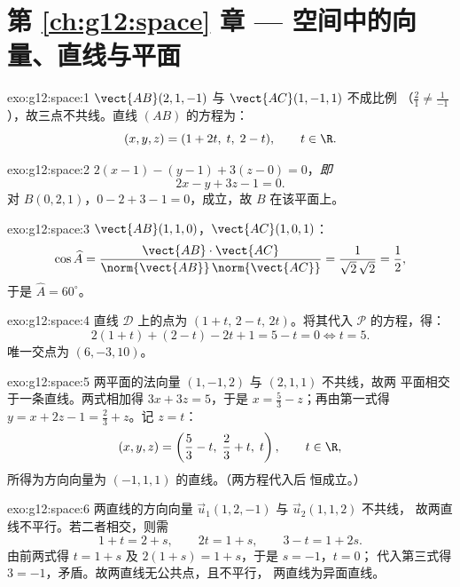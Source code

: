 \section*{第 \ref{ch:g12:space} 章 --- 空间中的向量、直线与平面}

\begin{solution}{exo:g12:space:1}
$\vect{AB}(2, 1, -1)$ 与 $\vect{AC}(1, -1, 1)$ 不成比例
（$\frac21 \neq \frac{1}{-1}$），故三点不共线。直线 $(AB)$ 的方程为：
\[
(x, y, z) = (1 + 2t,\; t,\; 2 - t), \qquad t \in \R .
\]
\end{solution}

\begin{solution}{exo:g12:space:2}
$2(x - 1) - (y - 1) + 3(z - 0) = 0$，\emph{即}
\[
2x - y + 3z - 1 = 0 .
\]
对 $B(0,2,1)$，$0 - 2 + 3 - 1 = 0$，成立，故 $B$ 在该平面上。
\end{solution}

\begin{solution}{exo:g12:space:3}
$\vect{AB}(1,1,0)$，$\vect{AC}(1,0,1)$：
\[
\cos\widehat{A}
= \frac{\vect{AB}\cdot\vect{AC}}{\norm{\vect{AB}}\,\norm{\vect{AC}}}
= \frac{1}{\sqrt2\,\sqrt2} = \frac12,
\]
于是 $\widehat A = 60^\circ$。
\end{solution}

\begin{solution}{exo:g12:space:4}
直线 $\mathcal D$ 上的点为 $(1 + t,\, 2 - t,\, 2t)$。将其代入
$\mathcal P$ 的方程，得：
\[
2(1+t) + (2 - t) - 2t + 1 = 5 - t = 0 \iff t = 5 .
\]
唯一交点为 $(6, -3, 10)$。
\end{solution}

\begin{solution}{exo:g12:space:5}
两平面的法向量 $(1, -1, 2)$ 与 $(2, 1, 1)$ 不共线，故两
平面相交于一条直线。两式相加得 $3x + 3z = 5$，于是
$x = \frac53 - z$；再由第一式得
$y = x + 2z - 1 = \frac23 + z$。记 $z = t$：
\[
(x, y, z) = \left(\frac53 - t,\; \frac23 + t,\; t\right), \qquad t \in \R,
\]
所得为方向向量为 $(-1, 1, 1)$ 的直线。（两方程代入后
恒成立。）
\end{solution}

\begin{solution}{exo:g12:space:6}
两直线的方向向量 $\vec u_1(1, 2, -1)$ 与 $\vec u_2(1, 1, 2)$ 不共线，
故两直线不平行。若二者相交，则需
\[
1 + t = 2 + s, \qquad 2t = 1 + s, \qquad 3 - t = 1 + 2s .
\]
由前两式得 $t = 1 + s$ 及 $2(1+s) = 1 + s$，于是 $s = -1$，$t = 0$；
代入第三式得 $3 = -1$，矛盾。故两直线无公共点，且不平行，
两直线为异面直线。
\end{solution}

